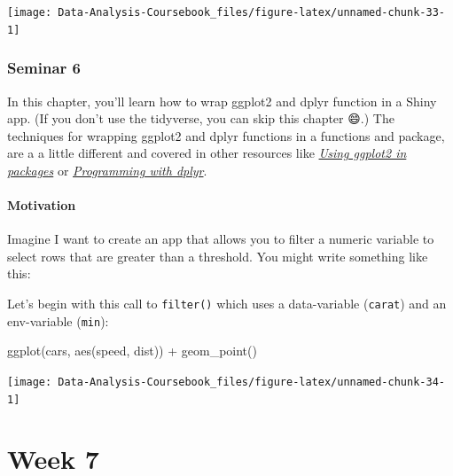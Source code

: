 \documentclass[
]{article}
\newenvironment{Shaded}{\begin{snugshade}}{\end{snugshade}}
\newcommand{\FunctionTok}[1]{\textcolor[rgb]{0.00,0.00,0.00}{#1}}
\newcommand{\NormalTok}[1]{#1}
\newcommand{\SpecialCharTok}[1]{\textcolor[rgb]{0.00,0.00,0.00}{#1}}
\begin{document}
\begin{center}\texttt{[image: Data-Analysis-Coursebook\_files/figure-latex/unnamed-chunk-33-1]} \end{center}

\hypertarget{seminar6}{%
\section{Seminar 6}\label{seminar6}}

In this chapter, you'll learn how to wrap ggplot2 and dplyr function in a Shiny app.
(If you don't use the tidyverse, you can skip this chapter 😄.) The techniques for wrapping ggplot2 and dplyr functions in a functions and package, are a a little different and covered in other resources like \href{http://ggplot2.tidyverse.org/dev/articles/ggplot2-in-packages.html}{\emph{Using ggplot2 in packages}} or \href{http://dplyr.tidyverse.org/articles/programming.html}{\emph{Programming with dplyr}}.

\hypertarget{tidy-motivation}{%
\subsection{Motivation}\label{tidy-motivation}}

Imagine I want to create an app that allows you to filter a numeric variable to select rows that are greater than a threshold.
You might write something like this:

Let's begin with this call to \texttt{filter()} which uses a data-variable (\texttt{carat}) and an env-variable (\texttt{min}):

\begin{Shaded}
\begin{Highlighting}[]
\FunctionTok{ggplot}\NormalTok{(cars, }\FunctionTok{aes}\NormalTok{(speed, dist)) }\SpecialCharTok{+} 
  \FunctionTok{geom\_point}\NormalTok{()}
\end{Highlighting}
\end{Shaded}

\begin{center}\texttt{[image: Data-Analysis-Coursebook\_files/figure-latex/unnamed-chunk-34-1]} \end{center}

\hypertarget{part-week-7}{%
\part*{Week 7}\label{part-week-7}}
\end{document}
